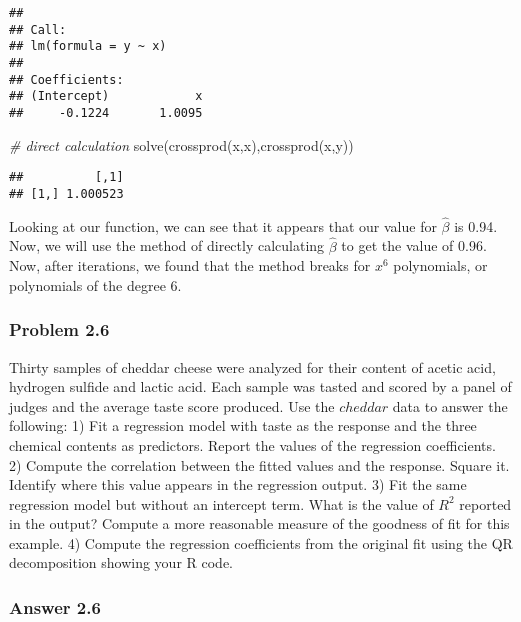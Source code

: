 \documentclass[
]{article}
\newenvironment{Shaded}{\begin{snugshade}}{\end{snugshade}}
\newcommand{\CommentTok}[1]{\textcolor[rgb]{0.56,0.35,0.01}{\textit{#1}}}
\newcommand{\FunctionTok}[1]{\textcolor[rgb]{0.00,0.00,0.00}{#1}}
\newcommand{\NormalTok}[1]{#1}
\begin{document}
\begin{verbatim}
## 
## Call:
## lm(formula = y ~ x)
## 
## Coefficients:
## (Intercept)            x  
##     -0.1224       1.0095
\end{verbatim}

\begin{Shaded}
\begin{Highlighting}[]
  \CommentTok{\# direct calculation}
  \FunctionTok{solve}\NormalTok{(}\FunctionTok{crossprod}\NormalTok{(x,x),}\FunctionTok{crossprod}\NormalTok{(x,y))}
\end{Highlighting}
\end{Shaded}

\begin{verbatim}
##          [,1]
## [1,] 1.000523
\end{verbatim}

Looking at our function, we can see that it appears that our value for
\(\hat{\beta}\) is 0.94. Now, we will use the method of directly
calculating \(\hat{\beta}\) to get the value of 0.96. Now, after
iterations, we found that the method breaks for \(x^6\) polynomials, or
polynomials of the degree 6.

\hypertarget{problem-2.6}{%
\subsubsection{Problem 2.6}\label{problem-2.6}}

Thirty samples of cheddar cheese were analyzed for their content of
acetic acid, hydrogen sulfide and lactic acid. Each sample was tasted
and scored by a panel of judges and the average taste score produced.
Use the \(cheddar\) data to answer the following: 1) Fit a regression
model with taste as the response and the three chemical contents as
predictors. Report the values of the regression coefficients. 2) Compute
the correlation between the fitted values and the response. Square it.
Identify where this value appears in the regression output. 3) Fit the
same regression model but without an intercept term. What is the value
of \(R^2\) reported in the output? Compute a more reasonable measure of
the goodness of fit for this example. 4) Compute the regression
coefficients from the original fit using the QR decomposition showing
your R code.

\hypertarget{answer-2.6}{%
\subsubsection{Answer 2.6}\label{answer-2.6}}
\end{document}

